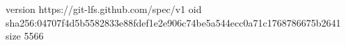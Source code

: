 version https://git-lfs.github.com/spec/v1
oid sha256:04707f4d5b5582833e88fdef1e2e906c74be5a544ecc0a71c1768786675b2641
size 5566
